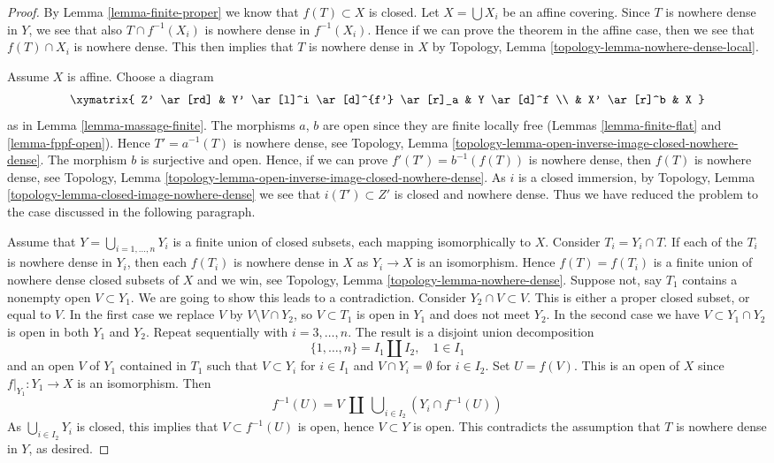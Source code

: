 \begin{proof}
By Lemma \ref{lemma-finite-proper} we know that $f(T) \subset X$ is closed.
Let $X = \bigcup X_i$ be an affine covering.
Since $T$ is nowhere dense in $Y$, we see that also $T \cap f^{-1}(X_i)$
is nowhere dense in $f^{-1}(X_i)$. Hence if we can prove the theorem in the
affine case, then we see that $f(T) \cap X_i$ is nowhere dense.
This then implies that $T$ is nowhere dense in $X$ by
Topology, Lemma \ref{topology-lemma-nowhere-dense-local}.

\medskip\noindent
Assume $X$ is affine. Choose a diagram
$$
\xymatrix{
Z' \ar[rd] &
Y' \ar[l]^i \ar[d]^{f'} \ar[r]_a &
Y \ar[d]^f \\
 & X' \ar[r]^b & X
}
$$
as in Lemma \ref{lemma-massage-finite}. The morphisms $a$, $b$ are
open since they are finite locally free
(Lemmas \ref{lemma-finite-flat} and \ref{lemma-fppf-open}).
Hence $T' = a^{-1}(T)$ is nowhere dense, see
Topology, Lemma \ref{topology-lemma-open-inverse-image-closed-nowhere-dense}.
The morphism $b$ is surjective and open.
Hence, if we can prove $f'(T') = b^{-1}(f(T))$ is
nowhere dense, then $f(T)$ is nowhere dense, see
Topology, Lemma \ref{topology-lemma-open-inverse-image-closed-nowhere-dense}.
As $i$ is a closed immersion, by
Topology, Lemma \ref{topology-lemma-closed-image-nowhere-dense}
we see that $i(T') \subset Z'$ is closed and nowhere dense.
Thus we have reduced the problem to the case discussed
in the following paragraph.

\medskip\noindent
Assume that $Y = \bigcup_{i = 1, \ldots, n} Y_i$ is a finite union of
closed subsets, each mapping isomorphically to $X$. Consider
$T_i = Y_i \cap T$. If each of the $T_i$ is nowhere dense in $Y_i$,
then each $f(T_i)$ is nowhere dense in $X$ as $Y_i \to X$ is an isomorphism.
Hence $f(T) = f(T_i)$ is a finite union of nowhere dense closed
subsets of $X$ and we win, see
Topology, Lemma \ref{topology-lemma-nowhere-dense}.
Suppose not, say $T_1$ contains a nonempty open $V \subset Y_1$.
We are going to show this leads to a contradiction.
Consider $Y_2 \cap V \subset V$. This is either
a proper closed subset, or equal to $V$. In the first case we replace
$V$ by $V \setminus V \cap Y_2$, so $V \subset T_1$ is open in $Y_1$ and
does not meet $Y_2$. In the second case we have
$V \subset Y_1 \cap Y_2$ is open in both $Y_1$ and $Y_2$.
Repeat sequentially with $i = 3, \ldots, n$. The result is a disjoint
union decomposition
$$
\{1, \ldots, n\} = I_1 \amalg I_2, \quad 1 \in I_1
$$
and an open $V$ of $Y_1$ contained in $T_1$ such that $V \subset Y_i$
for $i \in I_1$ and $V \cap Y_i = \emptyset$ for $i \in I_2$. Set
$U = f(V)$. This is an open of $X$ since $f|_{Y_1} : Y_1 \to X$ is
an isomorphism. Then
$$
f^{-1}(U) = V\ \amalg\ \bigcup\nolimits_{i \in I_2} (Y_i \cap f^{-1}(U))
$$
As $\bigcup_{i \in I_2} Y_i$ is closed, this implies that
$V \subset f^{-1}(U)$ is open, hence $V \subset Y$ is open.
This contradicts the assumption that $T$ is nowhere dense in $Y$, as desired.
\end{proof}







